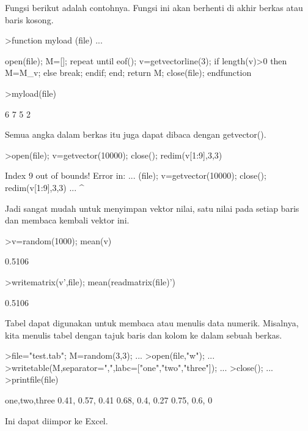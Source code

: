\documentclass[a4paper,10pt]{article}
\begin{document}
\begin{eulernotebook}
\begin{eulercomment}
Fungsi berikut adalah contohnya. Fungsi ini akan berhenti di akhir
berkas atau baris kosong.
\end{eulercomment}
\begin{eulerprompt}
>function myload (file) ...
\end{eulerprompt}
\begin{eulerudf}
  open(file);
  M=[];
  repeat
     until eof();
     v=getvectorline(3);
     if length(v)>0 then M=M_v; else break; endif;
  end;
  return M;
  close(file);
  endfunction
\end{eulerudf}
\begin{eulerprompt}
>myload(file)
\end{eulerprompt}
\begin{euleroutput}
          6         7 
          5         2 
\end{euleroutput}
\begin{eulercomment}
Semua angka dalam berkas itu juga dapat dibaca dengan getvector().
\end{eulercomment}
\begin{eulerprompt}
>open(file); v=getvector(10000); close(); redim(v[1:9],3,3)
\end{eulerprompt}
\begin{euleroutput}
  Index 9 out of bounds!
  Error in:
  ... (file); v=getvector(10000); close(); redim(v[1:9],3,3) ...
                                                       ^
\end{euleroutput}
\begin{eulercomment}
Jadi sangat mudah untuk menyimpan vektor nilai, satu nilai pada setiap
baris dan membaca kembali vektor ini.
\end{eulercomment}
\begin{eulerprompt}
>v=random(1000); mean(v)
\end{eulerprompt}
\begin{euleroutput}
  0.5106
\end{euleroutput}
\begin{eulerprompt}
>writematrix(v',file); mean(readmatrix(file)')
\end{eulerprompt}
\begin{euleroutput}
  0.5106
\end{euleroutput}
\begin{eulercomment}
Tabel dapat digunakan untuk membaca atau menulis data numerik.
Misalnya, kita menulis tabel dengan tajuk baris dan kolom ke dalam
sebuah berkas.
\end{eulercomment}
\begin{eulerprompt}
>file="test.tab"; M=random(3,3);  ...
>open(file,"w");  ...
>writetable(M,separator=",",labc=["one","two","three"]);  ...
>close(); ...
>printfile(file)
\end{eulerprompt}
\begin{euleroutput}
  one,two,three
        0.41,      0.57,      0.41
        0.68,       0.4,      0.27
        0.75,       0.6,         0
\end{euleroutput}
\begin{eulercomment}
Ini dapat diimpor ke Excel.


\end{eulercomment}
\end{eulernotebook}
\end{document}
